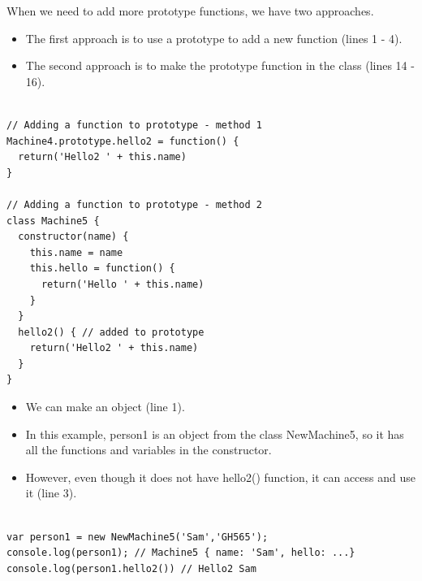 \begin{frame}[fragile]{}

When we need to add more prototype functions, we have two approaches.

\begin{itemize}
	\item The first approach is to use a prototype to add a new function (lines 1 - 4).
	\item The second approach is to make the prototype function in the class (lines 14 - 16). 
\end{itemize}

\begin{Code}{}%
\begin{lstlisting}[firstnumber=1, label=glabels, xleftmargin=0pt, basicstyle=\tiny]% 

// Adding a function to prototype - method 1
Machine4.prototype.hello2 = function() {
  return('Hello2 ' + this.name)
}

// Adding a function to prototype - method 2
class Machine5 {
  constructor(name) {
    this.name = name
    this.hello = function() {
      return('Hello ' + this.name)
    }
  }
  hello2() { // added to prototype
    return('Hello2 ' + this.name)
  }
}
\end{lstlisting}%
\end{Code}%

\end{frame}

\begin{frame}[fragile]{}

\begin{itemize}
	\item We can make an object (line 1). 
	\item In this example, person1 is an object from the class NewMachine5, so it has all the functions and variables in the constructor.
	\item However, even though it does not have hello2() function, it can access and use it (line 3). 
\end{itemize}

\begin{Code}{}%
\begin{lstlisting}[firstnumber=1, label=glabels, xleftmargin=0pt, basicstyle=\scriptsize]% 

var person1 = new NewMachine5('Sam','GH565');
console.log(person1); // Machine5 { name: 'Sam', hello: ...}
console.log(person1.hello2()) // Hello2 Sam
\end{lstlisting}%
\end{Code}%

\end{frame}

